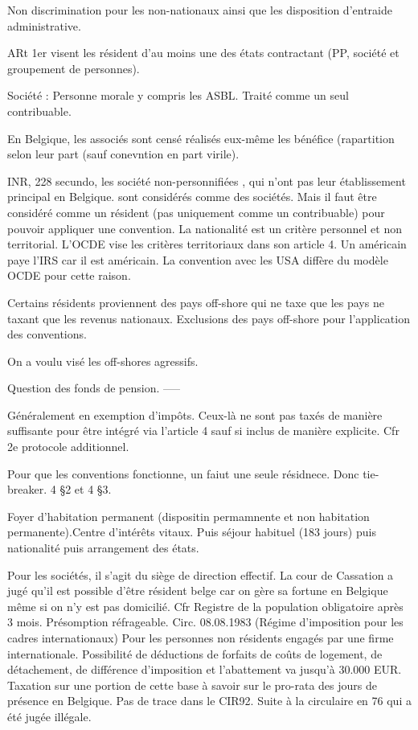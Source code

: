 \documentclass{book}
\begin{document}
Non discrimination pour les non-nationaux ainsi que les disposition d’entraide administrative.

ARt 1er visent les résident d’au moins une des états contractant (PP, société et groupement de personnes).

Société : Personne morale y compris les ASBL. Traité comme un seul contribuable. 

En Belgique, les associés sont censé réalisés eux-même les bénéfice (rapartition selon leur part (sauf conevntion en part virile).

INR, 228 secundo, les société non-personnifiées , qui n’ont pas leur établissement principal en Belgique. sont considérés comme des sociétés. Mais il faut être considéré comme un résident (pas uniquement comme un contribuable) pour pouvoir appliquer une convention. La nationalité est un critère personnel et non territorial. L’OCDE vise les critères territoriaux dans son article 4. Un américain paye l’IRS car il est américain. La convention avec les USA diffère du modèle OCDE pour cette raison.

Certains résidents proviennent des pays off-shore qui ne taxe que les pays ne taxant que les revenus nationaux. Exclusions des pays off-shore pour l’application des conventions.

On a voulu visé les off-shores agressifs.

Question des fonds de pension.
-----

Généralement en exemption d’impôts. Ceux-là ne sont pas taxés de manière suffisante pour être intégré via l’article 4 sauf si inclus de manière explicite. Cfr 2e protocole additionnel.


Pour que les conventions fonctionne, un faiut une seule résidnece. Donc tie-breaker. 4 §2 et 4 §3.

Foyer d’habitation permanent (dispositin permamnente et non habitation permanente).Centre d’intérêts vitaux. Puis séjour habituel (183 jours) puis nationalité puis arrangement des états.

Pour les sociétés, il s’agit du siège de direction effectif. La cour de Cassation a jugé qu’il est possible d’être résident belge car on gère sa fortune en Belgique même si on n’y est pas domicilié. Cfr Registre de la population obligatoire après 3 mois. Présomption réfrageable. Circ. 08.08.1983 (Régime d’imposition pour les cadres internationaux) Pour les personnes non résidents engagés par une firme internationale. Possibilité de déductions de forfaits de coûts de logement, de détachement, de différence d’imposition et l’abattement va jusqu’à 30.000 EUR. Taxation sur une portion de cette base à savoir sur le pro-rata des jours de présence en Belgique. Pas de trace dans le CIR92. Suite à la circulaire en 76 qui a été jugée illégale.
\end{document}
